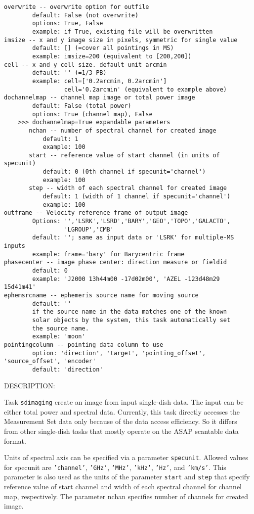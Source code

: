 \begin{verbatim}
overwrite -- overwrite option for outfile
        default: False (not overwrite)
        options: True, False
        example: if True, existing file will be overwritten
imsize -- x and y image size in pixels, symmetric for single value
        default: [] (=cover all pointings in MS)
        example: imsize=200 (equivalent to [200,200])
cell -- x and y cell size. default unit arcmin
        default: '' (=1/3 PB)
        example: cell=['0.2arcmin, 0.2arcmin']
                 cell='0.2arcmin' (equivalent to example above)
dochannelmap -- channel map image or total power image
        default: False (total power)
        options: True (channel map), False
    >>> dochannelmap=True expandable parameters
       nchan -- number of spectral channel for created image
           default: 1 
           example: 100
       start -- reference value of start channel (in units of specunit)
           default: 0 (0th channel if specunit='channel')
           example: 100
       step -- width of each spectral channel for created image
           default: 1 (width of 1 channel if specunit='channel')
           example: 100
outframe -- Velocity reference frame of output image
        Options: '','LSRK','LSRD','BARY','GEO','TOPO','GALACTO',
                 'LGROUP','CMB'
        default: ''; same as input data or 'LSRK' for multiple-MS inputs
        example: frame='bary' for Barycentric frame 
phasecenter -- image phase center: direction measure or fieldid 
        default: 0
        example: 'J2000 13h44m00 -17d02m00', 'AZEL -123d48m29 15d41m41'
ephemsrcname -- ephemeris source name for moving source
        default: ''
        if the source name in the data matches one of the known 
        solar objects by the system, this task automatically set 
        the source name. 
        example: 'moon' 
pointingcolumn -- pointing data column to use
        option: 'direction', 'target', 'pointing_offset', 'source_offset', 'encoder' 
        default: 'direction'

\end{verbatim}

DESCRIPTION:

Task {\tt sdimaging} create an image from input single-dish data.
The input can be either total power and spectral data. Currently,
this task directly accesses the Measurement Set data only because of 
the data access efficiency. So it differs from other single-dish 
tasks that mostly operate on the ASAP scantable data format.
 
Units of spectral axis can be specified via a parameter {\tt specunit}.
Allowed values for specunit are {\tt 'channel'}, {\tt 'GHz'}, {\tt 'MHz'}, {\tt 'kHz'}, {\tt 'Hz'}, 
and {\tt 'km/s'}. This parameter is also used as the units of the parameter 
{\tt start} and {\tt step} that specify reference value of start channel and 
width of each spectral channel for channel map, respectively. 
The parameter nchan specifies number of channels for created image. 

